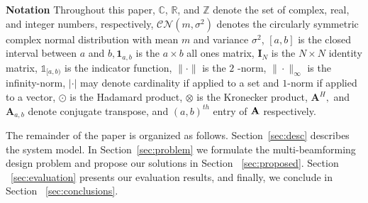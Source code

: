 \textbf{Notation} Throughout this paper, $\mathbb{C}$, $\mathbb{R}$, and $\mathbb{Z}$ denote the set of complex, real, and integer numbers, respectively,  $\mathcal{C N}\left(m, \sigma^{2}\right)$ denotes the circularly symmetric complex normal distribution with mean $m$ and variance $\sigma^{2}$, $[a, b]$ is the closed interval between $a$ and $b, \mathbf{1}_{a, b}$ is the $a \times b$ all ones matrix, $\mathbf{I}_{N}$ is the $N \times N$ identity matrix, $\mathds{1}_{[a, b)}$ is the indicator function, $\|\cdot\|$ is the $2$ -norm, $\|\cdot\|_{\infty}$ is the infinity-norm, $|\cdot|$ may denote cardinality if applied to a set and $1$-norm if applied to a vector, $\odot$ is the Hadamard product, $\otimes$ is the Kronecker product, $\mathbf{A}^{H},$ and $\mathbf{A}_{a, b}$ denote conjugate transpose, and $(a, b)^{t h}$ entry of ${\bf{A}}$ respectively.





The remainder of the paper is organized as follows. Section~\ref{sec:desc} describes the system model. In Section~\ref{sec:problem} we formulate the multi-beamforming design problem and propose our solutions in Section ~\ref{sec:proposed}. Section ~\ref{sec:evaluation} presents our evaluation results, and finally, we conclude in Section ~\ref{sec:conclusions}. %




